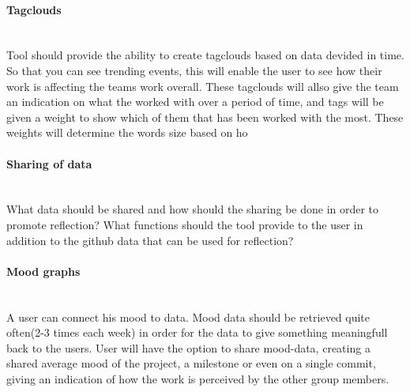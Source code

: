 \paragraph{Tagclouds}\mbox{}\\
Tool should provide the ability to create tagclouds based on data devided in time. So that you can see trending events, this will enable the user to see how their work is affecting the teams work overall. These tagclouds will allso give the team an indication on what the worked with over a period of time, and tags will be given a weight to show which of them that has been worked with the most. These weights will determine the words size based on ho

\paragraph{Sharing of data}\mbox{}\\
What data should be shared and how should the sharing be done in order to promote reflection? What functions should the tool provide to the user in addition to the github data that can be used for reflection?

\paragraph{Mood graphs}\mbox{}\\
A user can connect his mood to data. Mood data should be retrieved quite often(2-3 times each week) in order for the data to give something meaningfull back to the users.
User will have the option to share mood-data, creating a shared average mood of the project, a milestone or even on a single commit, giving an indication of how the work is perceived by the other group members. 
